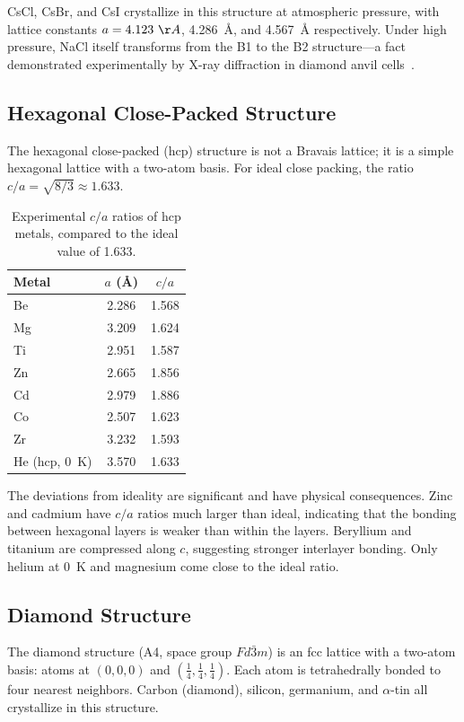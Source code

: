 CsCl, CsBr, and CsI crystallize in this structure at atmospheric pressure, with lattice constants $a = 4.123~\AA{}$, 4.286~\AA{}, and 4.567~\AA{} respectively. Under high pressure, NaCl itself transforms from the B1 to the B2 structure---a fact demonstrated experimentally by X-ray diffraction in diamond anvil cells~\cite{bragg1913structure}.


\subsection{Hexagonal Close-Packed Structure}

The hexagonal close-packed (hcp) structure is not a Bravais lattice; it is a simple hexagonal lattice with a two-atom basis. For ideal close packing, the ratio $c/a = \sqrt{8/3} \approx 1.633$.

\begin{table}[H]
\centering
\caption{Experimental $c/a$ ratios of hcp metals, compared to the ideal value of 1.633.}
\label{tab:hcp}
\begin{tabular}{@{}lSS@{}}
\toprule
Metal & {$a$ (\AA{})} & {$c/a$} \\
\midrule
Be  & 2.286 & 1.568 \\
Mg  & 3.209 & 1.624 \\
Ti  & 2.951 & 1.587 \\
Zn  & 2.665 & 1.856 \\
Cd  & 2.979 & 1.886 \\
Co  & 2.507 & 1.623 \\
Zr  & 3.232 & 1.593 \\
He (hcp, \SI{0}{\kelvin})  & 3.570 & 1.633 \\
\bottomrule
\end{tabular}
\end{table}

The deviations from ideality are significant and have physical consequences. Zinc and cadmium have $c/a$ ratios much larger than ideal, indicating that the bonding between hexagonal layers is weaker than within the layers. Beryllium and titanium are compressed along $c$, suggesting stronger interlayer bonding. Only helium at \SI{0}{\kelvin} and magnesium come close to the ideal ratio.


\subsection{Diamond Structure}

The diamond structure (A4, space group $Fd\bar{3}m$) is an fcc lattice with a two-atom basis: atoms at $(0,0,0)$ and $(\tfrac{1}{4},\tfrac{1}{4},\tfrac{1}{4})$. Each atom is tetrahedrally bonded to four nearest neighbors. Carbon (diamond), silicon, germanium, and $\alpha$-tin all crystallize in this structure.


